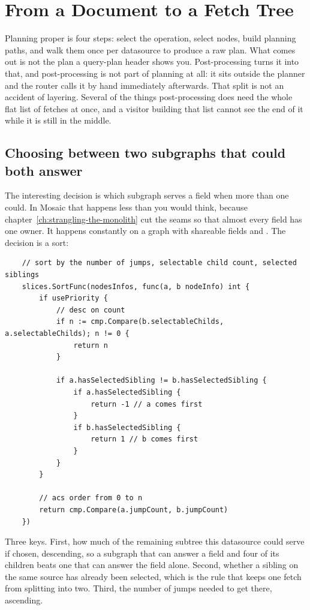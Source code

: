 \section{From a Document to a Fetch Tree}
\label{sec:ch17-from-a-document-to-a-fetch-tree}
%

Planning proper is four steps: select the operation, select nodes, build
planning paths, and walk them once per datasource to produce a raw plan. What
comes out is not the plan a query-plan header shows you. Post-processing turns
it into that, and post-processing is not part of planning at all: it sits
outside the planner and the router calls it by hand immediately afterwards.
That split is not an accident of layering. Several of the things
post-processing does need the whole flat list of fetches at once, and a visitor
building that list cannot see the end of it while it is still in the middle.

\subsection*{Choosing between two subgraphs that could both answer}

%
The interesting decision is which subgraph serves a field when more than one
could. In Mosaic that happens less than you would think, because
chapter~\ref{ch:strangling-the-monolith} cut the seams so that almost every
field has one owner. It happens constantly on a graph with shareable fields and
. The decision is a sort:

\begin{verbatim}
	// sort by the number of jumps, selectable child count, selected siblings
	slices.SortFunc(nodesInfos, func(a, b nodeInfo) int {
		if usePriority {
			// desc on count
			if n := cmp.Compare(b.selectableChilds, a.selectableChilds); n != 0 {
				return n
			}

			if a.hasSelectedSibling != b.hasSelectedSibling {
				if a.hasSelectedSibling {
					return -1 // a comes first
				}
				if b.hasSelectedSibling {
					return 1 // b comes first
				}
			}
		}

		// acs order from 0 to n
		return cmp.Compare(a.jumpCount, b.jumpCount)
	})
\end{verbatim}

Three keys. First, how much of the remaining subtree this datasource could serve
if chosen, descending, so a subgraph that can answer a field and four of its
children beats one that can answer the field alone. Second, whether a sibling on
the same source has already been selected, which is the rule that keeps one
fetch from splitting into two. Third, the number of  jumps needed to
get there, ascending.

